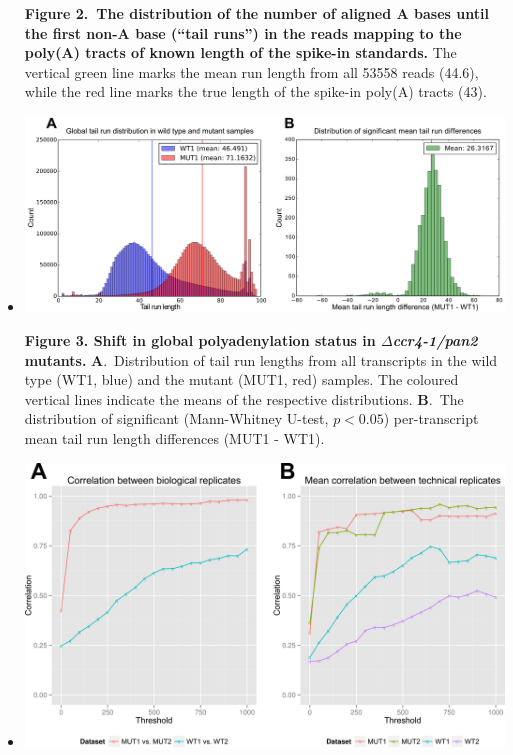 \documentclass[10pt]{article}
\begin{document}
\begin{itemize}
{\textbf{Figure 2.~The distribution of the number of aligned A bases until the first non-A base (``tail runs'') in the reads mapping to the poly(A) tracts of known length of the spike-in standards.} The vertical green line marks the mean run length from all 53558 reads (44.6), while the red line marks the true length of the spike-in poly(A) tracts (43).}
\newpage

\item[]{
\begin{center}
\includegraphics[scale=0.9]{Figure3.png}
\end{center}

\textbf{Figure 3. Shift in global polyadenylation status in \textit{$\Delta$ccr4-1/pan2} mutants.} \textbf{A}.~Distribution of tail run lengths from all transcripts in the wild type (WT1, blue) and the mutant (MUT1, red) samples. The coloured vertical lines indicate the means of the respective distributions.
\textbf{B}.~The distribution of significant (Mann-Whitney U-test, $p < 0.05$) per-transcript mean tail run length differences (MUT1 - WT1).
}
\newpage

\item[]{
\begin{center}
\includegraphics[scale=0.9]{Figure4.png}
\end{center}

}
\end{itemize}
\end{document}
